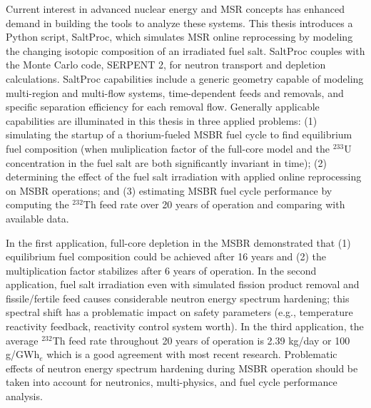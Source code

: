 \vspace{-0.15in}
Current interest in advanced nuclear energy and \gls{MSR} concepts has enhanced demand in building the tools to analyze these systems. This thesis introduces a Python script, SaltProc, which simulates \gls{MSR} online reprocessing by modeling the changing isotopic composition of an irradiated fuel salt. SaltProc couples with the Monte Carlo code, SERPENT 2, for neutron transport and depletion calculations. SaltProc capabilities include a generic geometry capable of modeling multi-region and multi-flow systems, time-dependent feeds and removals, and specific separation efficiency for each removal flow. Generally applicable  capabilities are illuminated in this thesis in three applied problems: (1) simulating the startup of a thorium-fueled \gls{MSBR} fuel cycle to find equilibrium fuel composition (when muliplication factor of the full-core model and the $^{233}$U concentration in the fuel salt are both significantly invariant in time); (2) determining the effect of the fuel salt irradiation with applied online reprocessing on \gls{MSBR} operations; and (3) estimating \gls{MSBR} fuel cycle performance by computing the $^{232}$Th feed rate over 20 years of operation and comparing with available data.

In the first application, full-core depletion in the \gls{MSBR} demonstrated that (1) equilibrium fuel composition could be achieved after 16 years and (2) the multiplication factor stabilizes after 6 years of operation. In the second application, fuel salt irradiation even with simulated fission product removal and fissile/fertile feed causes considerable neutron energy spectrum hardening; this spectral shift has a problematic impact on safety parameters (e.g., temperature reactivity feedback, reactivity control system worth). In the third application, the average $^{232}$Th feed rate throughout 20 years of operation is 2.39 kg/day or 100 g/GWh$_e$ which is a good agreement with most recent research. Problematic effects of neutron energy spectrum hardening during \gls{MSBR} operation should be taken into account for neutronics, multi-physics, and fuel cycle performance analysis.
